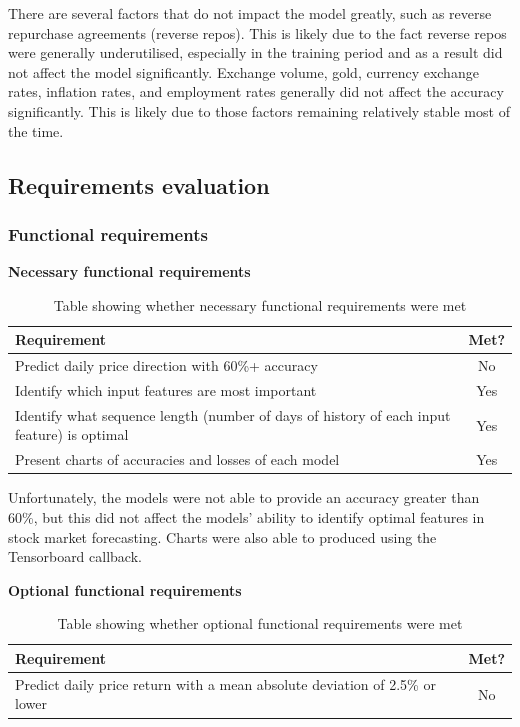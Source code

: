 There are several factors that do not impact the model greatly, such as reverse repurchase agreements (reverse repos).
This is likely due to the fact reverse repos were generally underutilised, especially in the training period and as a result did 
not affect the model significantly. Exchange volume, gold, currency exchange rates, inflation rates, and employment rates
generally did not affect the accuracy significantly. This is likely due to those factors remaining relatively stable most of the time.

\subsection{Requirements evaluation}
\subsubsection{Functional requirements}
\textbf{Necessary functional requirements}
\begin{table}[ht]
    \centering
    \begin{tabular}{|p{100mm}|c|}
        \hline
        Requirement & Met? \\
        \hline\hline
        Predict daily price direction with 60\%+ accuracy & No \\
        Identify which input features are most important & Yes \\
        Identify what sequence length (number of days of history of each input feature) is optimal & Yes \\
        Present charts of accuracies and losses of each model & Yes \\
        \hline
    \end{tabular}
    \caption{Table showing whether necessary functional requirements were met}
    \label{tab:necessary_functional_requirements}
\end{table}
\FloatBarrier

Unfortunately, the models were not able to provide an accuracy greater than 60\%, but this did not
affect the models' ability to identify optimal features in stock market forecasting. Charts were
also able to produced using the Tensorboard callback.

\textbf{Optional functional requirements}
\begin{table}[ht]
    \centering
    \begin{tabular}{|p{100mm}|c|}
        \hline
        Requirement & Met? \\
        \hline\hline
        Predict daily price return with a mean absolute deviation of 2.5\% or lower & No \\
        \hline
    \end{tabular}
    \caption{Table showing whether optional functional requirements were met}
    \label{tab:optional_functional_requirements}
\end{table}
\FloatBarrier

